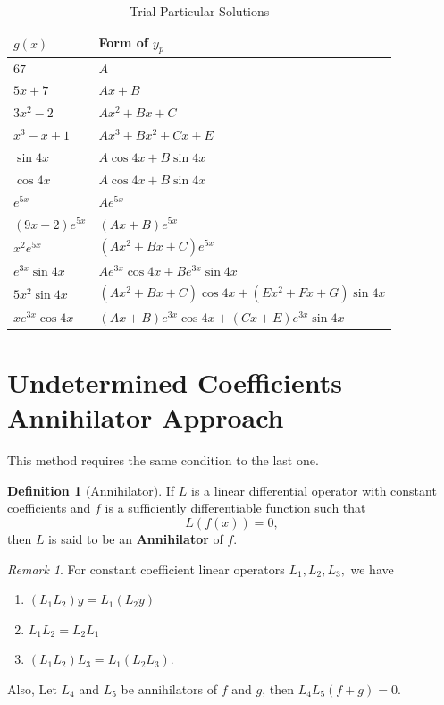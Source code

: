\documentclass[12pt,a4paper]{report}
\theoremstyle{definition}
\newtheorem{definition}[theorem]{Definition}
\theoremstyle{remark}
\newtheorem*{remark}{Remark}
\begin{document}
\begin{table}[H]
\centering
\caption{Trial Particular Solutions}
\label{tab:trial_solutions}
\begin{tabular}{ll}
\hline
$g(x)$ & Form of $y_p$ \\
\hline
$67$ & $A$ \\
$5x + 7$ & $Ax + B$ \\
$3x^2 - 2$ & $Ax^2 + Bx + C$ \\
$x^3 - x + 1$ & $Ax^3 + Bx^2 + Cx + E$ \\
$\sin 4x$ & $A\cos 4x + B\sin 4x$ \\
$\cos 4x$ & $A\cos 4x + B\sin 4x$ \\
$e^{5x}$ & $Ae^{5x}$ \\
$(9x - 2)e^{5x}$ & $(Ax + B)e^{5x}$ \\
$x^2 e^{5x}$ & $(Ax^2 + Bx + C)e^{5x}$ \\
$e^{3x}\sin 4x$ & $Ae^{3x}\cos 4x + Be^{3x}\sin 4x$ \\
$5x^2\sin 4x$ & $(Ax^2 + Bx + C)\cos 4x + (Ex^2 + Fx + G)\sin 4x$ \\
$xe^{3x}\cos 4x$ & $(Ax + B)e^{3x}\cos 4x + (Cx + E)e^{3x}\sin 4x$ \\
\hline
\end{tabular}
\end{table}


\section{Undetermined Coefficients -- Annihilator Approach}

This method requires the same condition to the last one.

\begin{definition}[Annihilator]
    If $L$ is a linear differential operator with constant coefficients and $f$ is a sufficiently differentiable function such that 
    \[L(f(x)) = 0,\]
    then $L$ is said to be an \textbf{Annihilator} of $f$.
\end{definition}
\begin{remark}
    For constant coefficient linear operators $L_1, L_2, L_3,$ we have 
    \begin{enumerate}
        \item $(L_1L_2)y = L_1(L_2y)$
        \item $L_1L_2 = L_2L_1$
        \item $(L_1L_2)L_3 = L_1(L_2L_3).$
    \end{enumerate}
    Also, Let $L_4$ and $L_5$ be annihilators of $f$ and $g$, then $L_4L_5(f + g) = 0.$
\end{remark}
\end{document}
